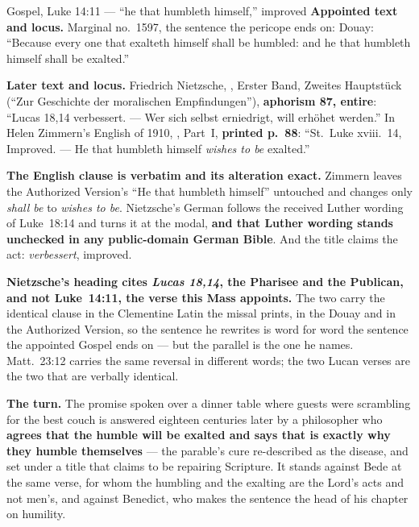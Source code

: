 \begin{afterlife}{Gospel, Luke 14:11 --- ``he that humbleth himself,'' improved}
\textbf{Appointed text and locus.} Marginal no.~1597, the sentence the pericope
ends on:  Douay: ``Because every one that exalteth himself shall be humbled:
and he that humbleth himself shall be exalted.''

\textbf{Later text and locus.} Friedrich Nietzsche, , Erster Band, Zweites Hauptstück
(``Zur Geschichte der moralischen Empfindungen''), \textbf{aphorism 87,
entire}: ``Lucas 18,14 verbessert. --- Wer sich selbst erniedrigt, will erhöhet
werden.'' In Helen Zimmern's English of 1910, , Part~I, \textbf{printed p.~88}: ``St.~Luke xviii.~14,
Improved. --- He that humbleth himself \emph{wishes to be} exalted.''

\textbf{The English clause is verbatim and its alteration exact.} Zimmern leaves
the Authorized Version's ``He that humbleth himself'' untouched and changes only
\emph{shall be} to \emph{wishes to be}. Nietzsche's German follows the received
Luther wording of Luke~18:14 and turns it at the modal, \textbf{and that
Luther wording stands unchecked in any public-domain German Bible}. And the title
claims the act: \emph{verbessert}, improved.

\textbf{Nietzsche's heading cites \emph{Lucas 18,14}, the Pharisee and the
Publican, and not Luke~14:11, the verse this Mass appoints.} The two carry the
identical clause in the Clementine Latin the missal prints, in the Douay and in
the Authorized Version, so the sentence he rewrites is word for word the
sentence the appointed Gospel ends on --- but the parallel is the one he names.
Matt.~23:12 carries the same reversal in different words; the two Lucan verses
are the two that are verbally identical.

\textbf{The turn.} The promise spoken over a dinner table where guests were
scrambling for the best couch is answered eighteen centuries later by a
philosopher who \textbf{agrees that the humble will be exalted and says that is
exactly why they humble themselves} --- the parable's cure re-described as the
disease, and set under a title that claims to be repairing Scripture. It stands
against Bede at the same verse, for whom the humbling and the exalting are the
Lord's acts and not men's, and against Benedict, who makes the sentence the head
of his chapter on humility.
\end{afterlife}

\clearpage
